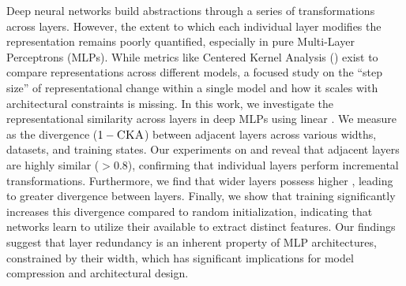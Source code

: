 Deep neural networks build abstractions through a series of transformations across layers. However, the extent to which each individual layer modifies the representation remains poorly quantified, especially in pure Multi-Layer Perceptrons (MLPs). While metrics like Centered Kernel Analysis (\cka) exist to compare representations across different models, a focused study on the ``step size'' of representational change within a single model and how it scales with architectural constraints is missing. In this work, we investigate the representational similarity across layers in deep MLPs using linear \cka. We measure \transcap as the divergence ($1 - \text{\textsc{CKA}}$) between adjacent layers across various widths, datasets, and training states. Our experiments on \mnist and \cifar reveal that adjacent layers are highly similar (\cka $> 0.8$), confirming that individual layers perform incremental transformations. Furthermore, we find that wider layers possess higher \transcap, leading to greater divergence between layers. Finally, we show that training significantly increases this divergence compared to random initialization, indicating that networks learn to utilize their available \transcap to extract distinct features. Our findings suggest that layer redundancy is an inherent property of MLP architectures, constrained by their width, which has significant implications for model compression and architectural design.
